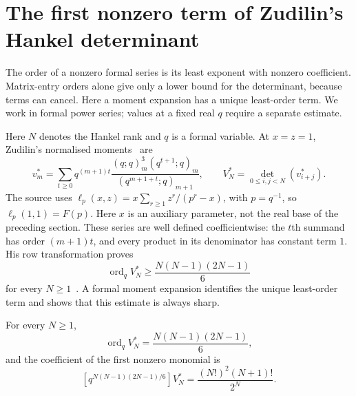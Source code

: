 \documentclass[11pt]{article}
\begin{document}
\section{The first nonzero term of Zudilin's Hankel determinant}
\label{sec:hankel-order}

The order of a nonzero formal series is its least exponent with nonzero
coefficient. Matrix-entry orders alone give only a lower bound for the
determinant, because terms can cancel. Here a moment expansion has a
unique least-order term. We work in formal power series; values at a
fixed real $q$ require a separate estimate.

Here $N$ denotes the Hankel rank and $q$ is a formal variable. At
$x=z=1$, Zudilin's normalised moments~\cite[(6), pp.~6--7]{zudilin2016} are
\[
 v_m^*=\sum_{t\ge0}q^{(m+1)t}
 \frac{(q;q)_m^3(q^{t+1};q)_m}{(q^{m+1+t};q)_{m+1}},
 \qquad
 V_N^*=\det_{0\le i,j<N}(v_{i+j}^*).
\]
The source uses $\ell_p(x,z)=x\sum_{r\ge1}z^r/(p^r-x)$, with
$p=q^{-1}$, so $\ell_p(1,1)=F(p)$. Here $x$ is an auxiliary parameter,
not the real base of the preceding section.
These series are well defined coefficientwise: the $t$th summand has
order $(m+1)t$, and every product in its denominator has constant term $1$.
His row transformation proves
\[
 \operatorname{ord}_q V_N^*\ge
 \frac{N(N-1)(2N-1)}6
\]
for every $N\ge1$~\cite[Sec.~4, Lemma~1, pp.~6--7]{zudilin2016}.  A formal moment expansion identifies the unique least-order term and
shows that this estimate is always sharp.

\begin{theorem}
\label{res:zudilin-sharp-qorder}
For every $N\ge1$,
\[
 \operatorname{ord}_q V_N^*=\frac{N(N-1)(2N-1)}6,
\]
and the coefficient of the first nonzero monomial is
\[
 [q^{N(N-1)(2N-1)/6}]V_N^*
   =\frac{(N!)^2(N+1)!}{2^N}.
\]
\end{theorem}
\end{document}
